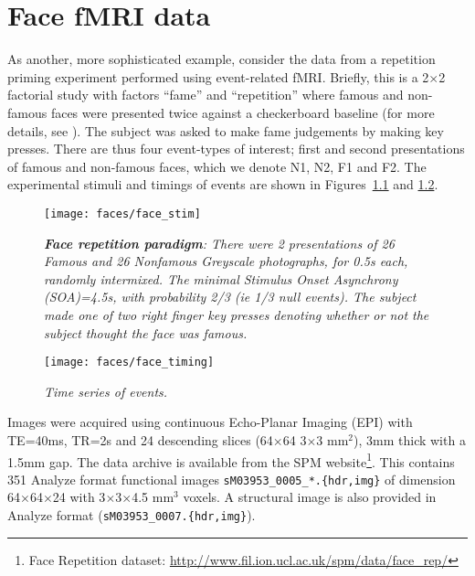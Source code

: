 \chapter{Face fMRI data \label{Chap:data:faces}}

As another, more sophisticated example, consider the data from a repetition priming experiment performed using event-related fMRI.
Briefly, this is a 2$\times$2 factorial study with factors ``fame'' and ``repetition'' where famous and non-famous faces were presented twice against a checkerboard baseline (for more details, see \cite{rnah_face_rep}). The subject was asked to make fame judgements by making key presses. There are thus four event-types of interest; first and second presentations of famous and non-famous faces, which we denote N1, N2, F1 and F2. The experimental stimuli and timings of events are shown in Figures~\ref{face_stim} and \ref{face_timing}.

\begin{figure}
\begin{center}
\texttt{[image: faces/face\_stim]}
\caption{\em \textbf{Face repetition paradigm}: There were 2 presentations of 26 Famous and 26 Nonfamous Greyscale photographs, for 0.5s each, randomly intermixed. The minimal Stimulus Onset Asynchrony (SOA)=4.5s, with probability 2/3 (ie 1/3 null events). The subject made one of two right finger key presses denoting whether or not the subject thought the face was famous. \label{face_stim}}
\end{center}
\end{figure}

\begin{figure}
\begin{center}
\texttt{[image: faces/face\_timing]}
\caption{\em Time series of events. \label{face_timing}}
\end{center}
\end{figure}

Images were acquired using continuous Echo-Planar Imaging (EPI) with TE=40ms, TR=2s and 24 descending slices (64$\times$64 3$\times$3 mm$^2$), 3mm thick with a 1.5mm gap.
The data archive is available from the SPM website\footnote{Face Repetition dataset: \url{http://www.fil.ion.ucl.ac.uk/spm/data/face_rep/}}.
This contains 351 Analyze format functional images \texttt{sM03953\_0005\_*.\{hdr,img\}} of dimension 64$\times$64$\times$24 with 3$\times$3$\times$4.5 mm$^3$ voxels. A structural image is also provided  in Analyze format (\texttt{sM03953\_0007.\{hdr,img\}}).

